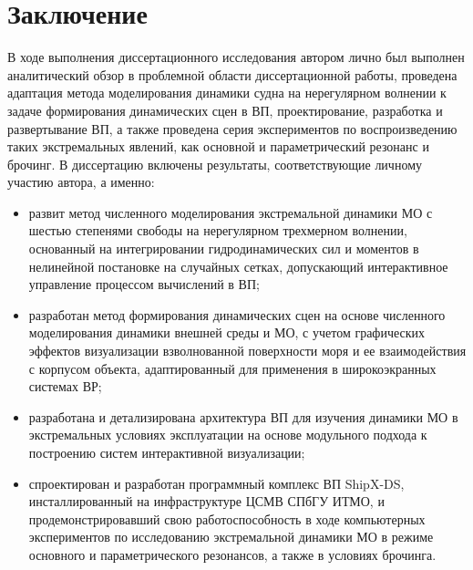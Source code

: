 \chapter*{Заключение}


В ходе выполнения диссертационного исследования автором лично был выполнен аналитический обзор в проблемной области диссертационной работы, проведена адаптация метода моделирования динамики судна на нерегулярном волнении к задаче формирования динамических сцен в ВП, проектирование, разработка и развертывание ВП, а также проведена серия экспериментов по воспроизведению таких экстремальных явлений, как основной и параметрический резонанс и брочинг. В диссертацию включены результаты, соответствующие личному участию автора, а именно:

\begin{itemize}

\item	развит метод численного моделирования экстремальной динамики МО с шестью степенями свободы на нерегулярном трехмерном волнении, основанный на интегрировании гидродинамических сил и моментов в нелинейной постановке на случайных сетках, допускающий интерактивное управление процессом вычислений в ВП;
\item	разработан метод формирования динамических сцен на основе численного моделирования динамики внешней среды и МО, с учетом графических эффектов визуализации взволнованной поверхности моря и ее взаимодействия с корпусом объекта, адаптированный для применения в широкоэкранных системах ВР;
\item	разработана и детализирована архитектура ВП для изучения динамики МО в экстремальных условиях эксплуатации на основе модульного подхода к построению систем интерактивной визуализации;
\item	спроектирован и разработан программный комплекс ВП ShipX-DS, инсталлированный на инфраструктуре ЦСМВ СПбГУ ИТМО, и продемонстрировавший свою работоспособность в ходе компьютерных экспериментов по исследованию экстремальной динамики МО в режиме основного и параметрического резонансов, а также в условиях брочинга.

\end{itemize}